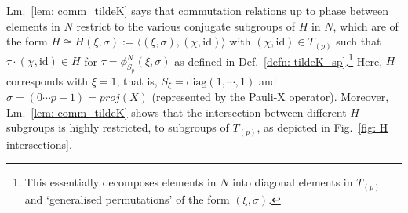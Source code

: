 \documentclass[aps,pra,letterpaper,onrcolumn,nofootinbib,notitlepage,longbibliography]{revtex4-1}
\newcommand{\diag}{\mathrm{diag}}
\newcommand{\id}{\mathrm{id}}
\begin{document}
Lm.~\ref{lem: comm_tildeK} says that commutation relations up to phase between elements in $N$ restrict to the various conjugate subgroups of $H$ in $N$, which are of the form $H\cong H(\xi,\sigma):=\langle(\xi,\sigma),(\chi,\id)\rangle$ with $(\chi,\id)\in T_{(p)}$ such that $\tau\cdot(\chi,\id)\in H$ for $\tau=\phi^N_{S_p}(\xi,\sigma)$ as defined in Def.~\ref{defn: tildeK_sp}.\footnote{This essentially decomposes elements in $N$ into diagonal elements in $T_{(p)}$ and `generalised permutations' of the form $(\xi,\sigma)$.} Here, $H$ corresponds with $\xi=1$, that is, $S_\xi=\diag(1,\cdots,1)$ and $\sigma=(0\cdots p-1)=proj(X)$ (represented by the Pauli-X operator). Moreover, Lm.~\ref{lem: comm_tildeK} shows that the intersection between different $H$-subgroups is highly restricted, to subgroups of $T_{(p)}$, as depicted in Fig.~\ref{fig: H intersections}.
\end{document}
